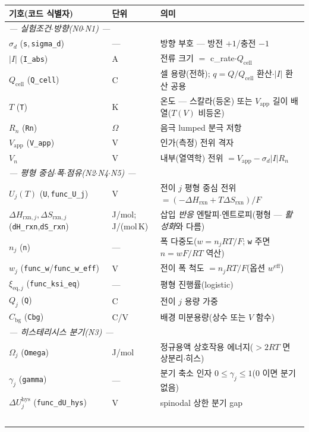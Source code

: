 \documentclass[11pt,a4paper]{article}
\newcommand{\eff}{\mathrm{eff}}
\newcommand{\eq}{\mathrm{eq}}
\newcommand{\app}{\mathrm{app}}
\newcommand{\cell}{\mathrm{cell}}
\newcommand{\bg}{\mathrm{bg}}
\newcommand{\rxn}{\mathrm{rxn}}
\newcommand{\hys}{\mathrm{hys}}
\newcommand{\code}[1]{\texttt{#1}}
\begin{document}
\begin{longtable}{p{} p{} p{}}
\toprule 기호(코드 식별자) & 단위 & 의미 \\ \midrule \endhead
\multicolumn{3}{l}{\emph{— 실험조건$\cdot$방향(N0$\cdot$N1) —}}\\
$\sigma_d$ (\code{s},\,\code{sigma\_d}) & --- & 방향 부호 — 방전 $+1$/충전 $-1$ \\
$|I|$ (\code{I\_abs}) & A & 전류 크기 $=$ c\_rate$\cdot Q_\cell$ \\
$Q_\cell$ (\code{Q\_cell}) & C & 셀 용량(전하); $q=Q/Q_\cell$ 환산$\cdot$$|I|$ 환산 공용 \\
$T$ (\code{T}) & K & 온도 — 스칼라(등온) 또는 $V_\app$ 길이 배열($T(V)$ 비등온) \\
$R_n$ (\code{Rn}) & $\Omega$ & 음극 lumped 분극 저항 \\
$V_\app$ (\code{V\_app}) & V & 인가(측정) 전위 격자 \\
$V_n$ & V & 내부(열역학) 전위 $=V_\app-\sigma_d|I|R_n$ \\
\multicolumn{3}{l}{\emph{— 평형 중심$\cdot$폭$\cdot$점유(N2$\cdot$N4$\cdot$N5) —}}\\
$U_j(T)$ (\code{U},\,\code{func\_U\_j}) & V & 전이 $j$ 평형 중심 전위 $=(-\Delta H_\rxn+T\Delta S_\rxn)/F$ \\
$\Delta H_{\rxn,j},\Delta S_{\rxn,j}$ (\code{dH\_rxn},\code{dS\_rxn}) & {\footnotesize J/mol;\,J/(mol\,K)} & 삽입 \emph{반응} 엔탈피$\cdot$엔트로피(평형 — \emph{활성화}와 다름) \\
$n_j$ (\code{n}) & --- & 폭 다중도($w=n_jRT/F$; \code{w} 주면 $n=wF/RT$ 역산) \\
$w_j$ (\code{func\_w}/\code{func\_w\_eff}) & V & 전이 폭 척도 $=n_jRT/F$(옵션 $w^\eff$) \\
$\xi_{\eq,j}$ (\code{func\_ksi\_eq}) & --- & 평형 진행률(logistic) \\
$Q_j$ (\code{Q}) & C & 전이 $j$ 용량 가중 \\
$C_\bg$ (\code{Cbg}) & C/V & 배경 미분용량(상수 또는 $V$ 함수) \\
\multicolumn{3}{l}{\emph{— 히스테리시스 분기(N3) —}}\\
$\Omega_j$ (\code{Omega}) & J/mol & 정규용액 상호작용 에너지($>2RT$ 면 상분리$\cdot$히스) \\
$\gamma_j$ (\code{gamma}) & --- & 분기 축소 인자 $0\le\gamma_j\le1$($0$ 이면 분기 없음) \\
$\Delta U_j^\hys$ (\code{func\_dU\_hys}) & V & spinodal 상한 분기 gap \\
$$
\end{longtable}
\end{document}
